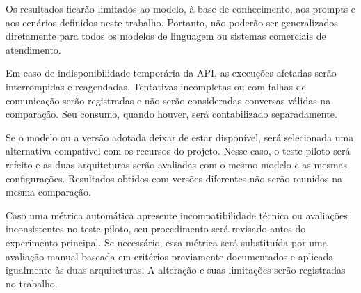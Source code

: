 Os resultados ficarão limitados ao modelo, à base de conhecimento, aos prompts e aos cenários definidos neste trabalho. Portanto, não poderão ser generalizados diretamente para todos os modelos de linguagem ou sistemas comerciais de atendimento.

Em caso de indisponibilidade temporária da \gls{API}, as execuções
afetadas serão interrompidas e reagendadas. Tentativas incompletas
ou com falhas de comunicação serão registradas e não serão
consideradas conversas válidas na comparação. Seu consumo,
quando houver, será contabilizado separadamente.

Se o modelo ou a versão adotada deixar de estar disponível,
será selecionada uma alternativa compatível com os recursos
do projeto. Nesse caso, o teste-piloto será refeito e as duas
arquiteturas serão avaliadas com o mesmo modelo e as mesmas
configurações. Resultados obtidos com versões diferentes não
serão reunidos na mesma comparação.

Caso uma métrica automática apresente incompatibilidade técnica
ou avaliações inconsistentes no teste-piloto, seu procedimento
será revisado antes do experimento principal. Se necessário,
essa métrica será substituída por uma avaliação manual baseada
em critérios previamente documentados e aplicada igualmente
às duas arquiteturas. A alteração e suas limitações serão
registradas no trabalho.